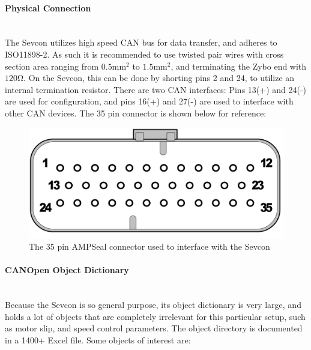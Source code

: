

\paragraph*{Physical Connection}\label{sub:sevcon_physical_connection}~\\
The Sevcon utilizes high speed CAN bus for data transfer, and adheres to ISO11898-2.
As such it is recommended to use twisted pair wires with cross section area ranging from $0.5 \si{\milli \meter \squared}$ to $1.5 \si{\milli \meter \squared}$, and terminating the Zybo end with $120 \si{\ohm}$.
On the Sevcon, this can be done by shorting pins 2 and 24, to utilize an internal termination resistor.
There are two CAN interfaces: Pins 13(+) and 24(-) are used for configuration, and pins 16(+) and 27(-) are used to interface with other CAN devices.
The 35 pin connector is shown below for reference:

\begin{figure}[h]
	\centering
	\includegraphics[width = 0.6\linewidth]{graphics/35_pin_dsub}
	\caption{The 35 pin AMPSeal connector used to interface with the Sevcon}
	\label{fig:35_pin_dsub}
\end{figure}

\paragraph*{CANOpen Object Dictionary}\label{sub:sevcon_object_dictionary}~\\
Because the Sevcon is so general purpose, its object dictionary is very large, and holds a lot of objects that are completely irrelevant for this particular setup, such as motor slip, and speed control parameters. 
The object directory is documented in a 1400+ Excel file. 
Some objects of interest are:

